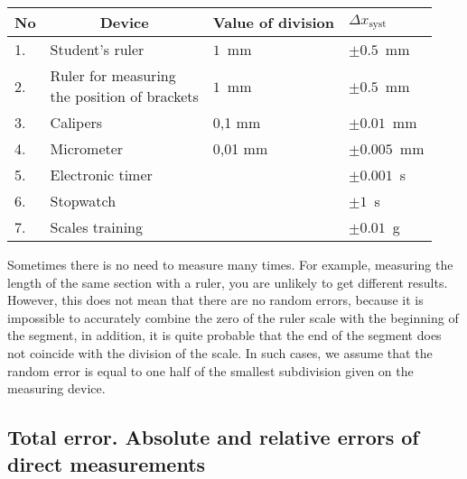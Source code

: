 \documentclass{LabWorkEng}
\begin{document}
\begin{table}[!htbp]\centering
	\tabcaption{}
	\label{tab1}
	\begin{tabular}{|l|l|l|l|}
		\hline\rowcolor{gray!50}
		No & \multicolumn{1}{c|}{Device}      & \multicolumn{1}{c|}{Value of division} & $\Delta x_\mathrm{syst}$ \\ \hline
		1. & Student's ruler                  & $1$~mm                                 & $\pm 0.5$~mm             \\ \hline
		2. & \makecell[l]{Ruler for measuring                                                                     \\the position of brackets} & $1$~mm            & $\pm 0.5$~mm             \\ \hline
		3. & Calipers                         & 0,1 mm                                 & $\pm 0.01$~mm            \\ \hline
		4. & Micrometer                       & 0,01 mm                                & $\pm 0.005$~mm           \\ \hline
		5. & Electronic timer                 &                                        & $\pm 0.001$~s            \\ \hline
		6. & Stopwatch                        &                                        & $\pm 1$~s                \\ \hline
		7. & Scales training                  &                                        & $\pm 0.01$~g             \\ \hline
	\end{tabular}%
\end{table}

\noindent%
\begin{More}
	Sometimes there is no need to measure many times. For example, measuring the length of the same section with a ruler, you are unlikely to get different results. However, this does not mean that there are no random errors, because it is impossible to accurately combine the zero of the ruler scale with the beginning of the segment, in addition, it is quite probable that the end of the segment does not coincide with the division of the scale. In such cases, we assume that the random error is equal to one half of the smallest subdivision given on the measuring device.
\end{More}

\subsection{Total error. Absolute and relative errors of direct measurements}
\end{document}
